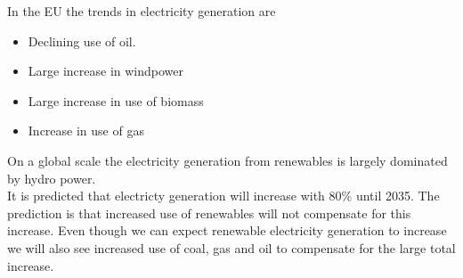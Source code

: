In the EU the trends in electricity generation are
\begin{itemize}
    \item Declining use of oil.
    \item Large increase in windpower
    \item Large increase in use of biomass
    \item Increase in use of gas
\end{itemize}

On a global scale the electricity generation from renewables is largely dominated by hydro power.\\

It is predicted that electricty generation will increase with 80\% until 2035.
The prediction is that increased use of renewables will not compensate for this increase.
Even though we can expect renewable electricity generation to increase we will also see increased use of coal, gas and oil to compensate for the large total increase.

